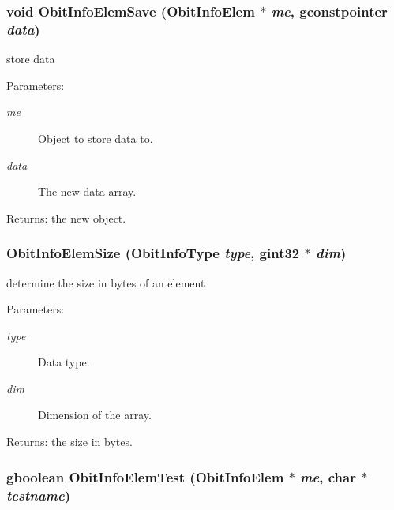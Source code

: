 \subsubsection{\setlength{\rightskip}{0pt plus 5cm}void Obit\-Info\-Elem\-Save ({\bf Obit\-Info\-Elem} $\ast$ {\em me}, gconstpointer {\em data})}\label{ObitInfoElem_8h_a8}


store data 

\begin{Desc}
\item[Parameters:]
\begin{description}
\item[{\em me}]Object to store data to. \item[{\em data}]The new data array. \end{description}
\end{Desc}
\begin{Desc}
\item[Returns:]the new object. \end{Desc}
\subsubsection{ Obit\-Info\-Elem\-Size (Obit\-Info\-Type {\em type}, gint32 $\ast$ {\em dim})}\label{ObitInfoElem_8h_a10}


determine the size in bytes of an element 

\begin{Desc}
\item[Parameters:]
\begin{description}
\item[{\em type}]Data type. \item[{\em dim}]Dimension of the array. \end{description}
\end{Desc}
\begin{Desc}
\item[Returns:]the size in bytes. \end{Desc}
\subsubsection{\setlength{\rightskip}{0pt plus 5cm}gboolean Obit\-Info\-Elem\-Test ({\bf Obit\-Info\-Elem} $\ast$ {\em me}, char $\ast$ {\em testname})}\label{ObitInfoElem_8h_a5}


